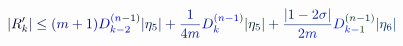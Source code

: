 \documentclass[12pt]{article}
\begin{document}
\makeatletter
\renewcommand*{\@textcolor}[3]{%
  \protect\leavevmode
  \begingroup
    \color#1{#2}#3%
  \endgroup
}
\makeatother
\begin{displaymath}
\mathcolor[RGB]{0,0,15}{|} \mathcolor[RGB]{0,0,30}{R} _ { \mathcolor[RGB]{0,0,45}{k} } ^ { \mathcolor[RGB]{0,0,60}{\prime} } \mathcolor[RGB]{0,0,75}{|} \mathcolor[RGB]{0,0,90}{\leq} \mathcolor[RGB]{0,0,105}{(} \mathcolor[RGB]{0,0,120}{m} \mathcolor[RGB]{0,0,135}{+} \mathcolor[RGB]{0,0,150}{1} \mathcolor[RGB]{0,0,165}{)} \mathcolor[RGB]{0,0,180}{D} _ { \mathcolor[RGB]{0,0,195}{k} \mathcolor[RGB]{0,0,210}{-} \mathcolor[RGB]{0,0,225}{2} } ^ { \mathcolor[RGB]{0,0,240}{(} \mathcolor[RGB]{0,0,255}{n} \mathcolor[RGB]{0,15,0}{-} \mathcolor[RGB]{0,15,15}{1} \mathcolor[RGB]{0,15,30}{)} } \mathcolor[RGB]{0,15,45}{|} \mathcolor[RGB]{0,15,60}{\eta} _ { \mathcolor[RGB]{0,15,75}{5} } \mathcolor[RGB]{0,15,90}{|} \mathcolor[RGB]{0,15,105}{+} \mathcolor[RGB]{0,15,120}{\frac { \mathcolor[RGB]{0,15,135}{1} } { \mathcolor[RGB]{0,15,150}{4} \mathcolor[RGB]{0,15,165}{m} } } \mathcolor[RGB]{0,15,180}{D} _ { \mathcolor[RGB]{0,15,195}{k} } ^ { \mathcolor[RGB]{0,15,210}{(} \mathcolor[RGB]{0,15,225}{n} \mathcolor[RGB]{0,15,240}{-} \mathcolor[RGB]{0,15,255}{1} \mathcolor[RGB]{0,30,0}{)} } \mathcolor[RGB]{0,30,15}{|} \mathcolor[RGB]{0,30,30}{\eta} _ { \mathcolor[RGB]{0,30,45}{5} } \mathcolor[RGB]{0,30,60}{|} \mathcolor[RGB]{0,30,75}{+} \mathcolor[RGB]{0,30,90}{\frac { \mathcolor[RGB]{0,30,105}{|} \mathcolor[RGB]{0,30,120}{1} \mathcolor[RGB]{0,30,135}{-} \mathcolor[RGB]{0,30,150}{2} \mathcolor[RGB]{0,30,165}{\sigma} \mathcolor[RGB]{0,30,180}{|} } { \mathcolor[RGB]{0,30,195}{2} \mathcolor[RGB]{0,30,210}{m} } } \mathcolor[RGB]{0,30,225}{D} _ { \mathcolor[RGB]{0,30,240}{k} \mathcolor[RGB]{0,30,255}{-} \mathcolor[RGB]{0,45,0}{1} } ^ { \mathcolor[RGB]{0,45,15}{(} \mathcolor[RGB]{0,45,30}{n} \mathcolor[RGB]{0,45,45}{-} \mathcolor[RGB]{0,45,60}{1} \mathcolor[RGB]{0,45,75}{)} } \mathcolor[RGB]{0,45,90}{|} \mathcolor[RGB]{0,45,105}{\eta} _ { \mathcolor[RGB]{0,45,120}{6} } \mathcolor[RGB]{0,45,135}{|}
\end{displaymath}
\end{document}
